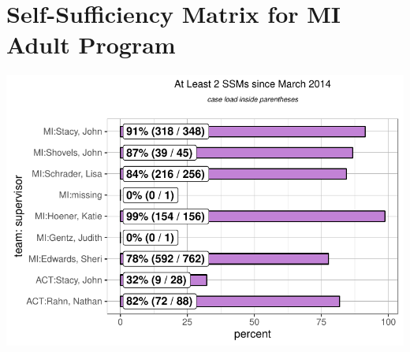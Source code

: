 \documentclass{article}\usepackage[]{graphicx}\usepackage[]{color}
\makeatletter
\def\maxwidth{ %
  \ifdim\Gin@nat@width>\linewidth
    \linewidth
  \else
    \Gin@nat@width
  \fi
}
\newenvironment{knitrout}{}{} %
\makeatother
\begin{document}
\pagebreak
\section{Self-Sufficiency Matrix for MI Adult Program}
\begin{knitrout}
\color{fgcolor}
\includegraphics[width=\maxwidth]{figure/ssm_ts-1} 

\end{knitrout}

\end{document}
